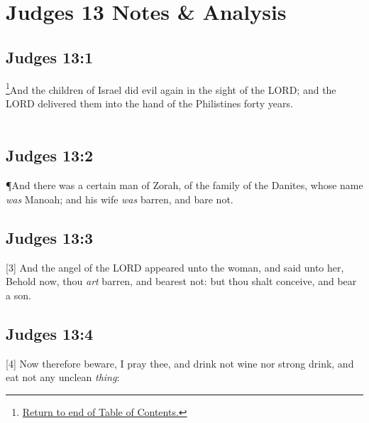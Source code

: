 \chapter{Judges 13 Notes \& Analysis}
\section{Judges 13:1}
\footnote{\textcolor[rgb]{0.00,0.25,0.00}{\hyperlink{JudgesTOC}{Return to end of Table of Contents.}}}\textcolor[rgb]{0.00,0.00,1.00}{And the children of Israel did evil again in the sight of the LORD; and the LORD delivered them into the hand of the Philistines forty years.}\\
\\
\section{Judges 13:2}
\P \textcolor[rgb]{0.00,0.00,1.00}{And there was a certain man of Zorah, of the family of the Danites, whose name \emph{was} Manoah; and his wife \emph{was} barren, and bare not.}
\section{Judges 13:3}
[3] \textcolor[rgb]{0.00,0.00,1.00}{And the angel of the LORD appeared unto the woman, and said unto her, Behold now, thou \emph{art} barren, and bearest not: but thou shalt conceive, and bear a son.}
\section{Judges 13:4}
[4] \textcolor[rgb]{0.00,0.00,1.00}{Now therefore beware, I pray thee, and drink not wine nor strong drink, and eat not any unclean \emph{thing}:}

